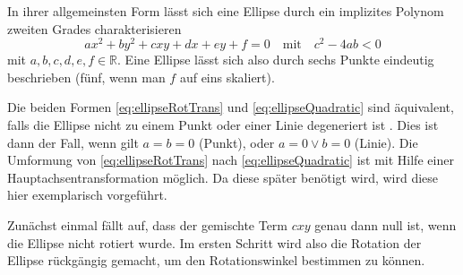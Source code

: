 In ihrer allgemeinsten Form lässt sich eine Ellipse durch ein implizites Polynom zweiten Grades charakterisieren
\begin{equation} \label{eq:ellipseQuadratic}
ax^2 + by^2 + cxy + dx + ey + f = 0 \quad \text{mit}\quad c^2-4ab < 0
\end{equation}
mit $a,b,c,d,e,f \in \mathbb{R}$. Eine Ellipse lässt sich also durch sechs Punkte eindeutig beschrieben (fünf, wenn man $f$ auf eins skaliert).


Die beiden Formen \ref{eq:ellipseRotTrans} und \ref{eq:ellipseQuadratic} sind äquivalent, falls die Ellipse nicht zu einem Punkt oder einer Linie degeneriert ist \cite{Lawrence1972}. Dies ist dann der Fall, wenn gilt $a = b = 0$ (Punkt), oder $a = 0 \lor b = 0$ (Linie). Die Umformung von \ref{eq:ellipseRotTrans} nach \ref{eq:ellipseQuadratic} ist mit Hilfe einer Hauptachsentransformation möglich.
Da diese später benötigt wird, wird diese hier exemplarisch vorgeführt.

Zunächst einmal fällt auf, dass der gemischte Term $cxy$ genau dann null ist, wenn die Ellipse nicht rotiert wurde. Im ersten Schritt wird also die Rotation der Ellipse rückgängig gemacht, um den Rotationswinkel bestimmen zu können.

